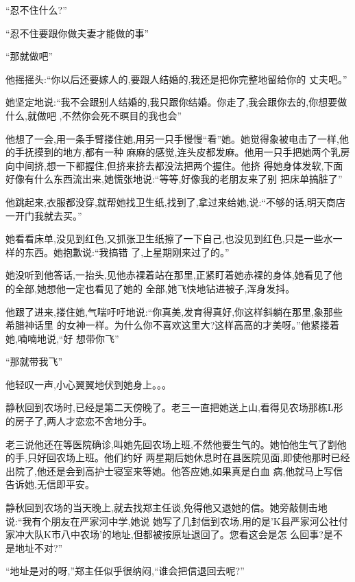 ﻿\documentclass[12pt]{article}
\begin{document}
``忍不住什么?''

``忍不住\myrule 要跟你\myrule 做\myrule 夫妻才能做的事\myrule ''

``那就做吧\myrule ''

他摇摇头:``你\myrule 以后还要\myrule 嫁人的,要跟人结婚的,我还是\myrule 把你\myrule 完整地留给你的
\myrule 丈夫吧。''

她坚定地说:``我不会跟别人结婚的,我只跟你结婚。你走了,我会跟你\myrule 去的,你想要做什么,就做吧\myrule 
,不然\myrule 你会死不暝目的\myrule 我也会\myrule ''

他想了一会,用一条手臂搂住她,用另一只手慢慢``看''她。她觉得象被电击了一样,他的手抚摸到的地方,都有一种
麻麻的感觉,连头皮都发麻。他用一只手把她两个乳房向中间挤,想一下都握住,但挤来挤去都没法把两个握住。他挤
得她身体发软,下面好像有什么东西流出来,她慌张地说:``等等,好像\myrule 我的老朋友\myrule 来了\myrule 别
把床单搞脏了\myrule ''

他跳起来,衣服都没穿,就帮她找卫生纸,找到了,拿过来给她,说:``不够的话,明天商店一开门我就去买。''

她看看床单,没见到红色,又抓张卫生纸擦了一下自己,也没见到红色,只是一些水一样的东西。她抱歉说:``我搞错
了,上星期刚来过了的。''

她没听到他答话,一抬头,见他赤裸着站在那里,正紧盯着她赤裸的身体,她看见了他的全部,她想他一定也看见了她的
全部,她飞快地钻进被子,浑身发抖。

他跟了进来,搂住她,气喘吁吁地说:``你\myrule 真美,发育得\myrule 真好,你这样斜躺在那里,象那些希腊神话里
的女神一样。为什么你不喜欢\myrule 这里大?这样\myrule 高高的才\myrule 美呀。''他紧搂着她,喃喃地说,``好
想带你飞\myrule ''

``那就带我飞\myrule ''

他轻叹一声,小心翼翼地伏到她身上。。。

静秋回到农场时,已经是第二天傍晚了。老三一直把她送上山,看得见农场那栋L形的房子了,两人才恋恋不舍地分手。

老三说他还在等医院确诊,叫她先回农场上班,不然他要生气的。她怕他生气了割他的手,只好回农场上班。他们约好
两星期后她休息时在县医院见面,即使他那时已经出院了,他还是会到高护士寝室来等她。他答应她,如果真是白血
病,他就马上写信告诉她,无信即平安。

静秋回到农场的当天晚上,就去找郑主任谈,免得他又退她的信。她旁敲侧击地说:``我有个朋友在严家河中学,她说
她写了几封信到农场,用的是'K县严家河公社付家冲大队K市八中农场'的地址,但都被按原址退回了。您看这会是怎
么回事?是不是地址不对?''

``地址是对的呀,''郑主任似乎很纳闷,``谁会把信退回去呢?''
\end{document}
